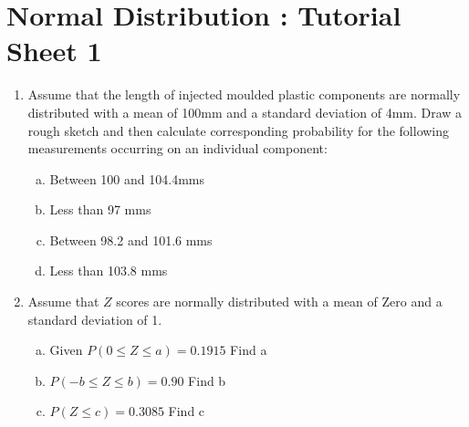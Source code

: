 \documentclass[a4paper,12pt]{article}
\begin{document}
\section*{Normal Distribution : Tutorial Sheet 1}
\begin{enumerate}

\item Assume that the length of injected moulded plastic components are normally distributed with a mean of 100mm and a standard deviation of 4mm.  Draw a rough sketch and then calculate corresponding probability for the following measurements occurring on an individual component:

\begin{enumerate}[(a)]
\item Between 100 and 104.4mms
\item Less than 97 mms
\item Between 98.2 and 101.6 mms
\item Less than 103.8 mms
\end{enumerate}



\item Assume that $Z$ scores are normally distributed with a mean of Zero and a
standard deviation of 1.
\begin{enumerate}[(a)]
\item Given $P (0\leq  Z \leq  a)  =  0.1915$  Find   a 
\item $P(- b\leq  Z \leq  b) =  0.90$             Find   b
\item $P(Z \leq c)  =       0.3085$  Find   c
\end{enumerate}
\end{enumerate}
\end{document}
